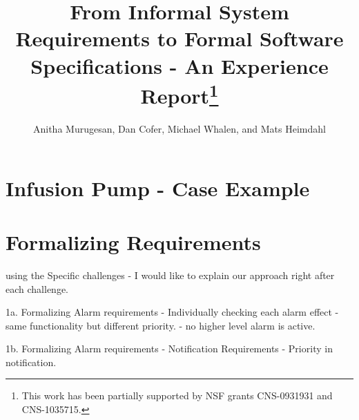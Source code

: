 \documentclass{llncs}
\begin{document}
\newcommand{\mcdc}{}%
\newcommand{\mike}[1]{\textcolor{red}{Mike: #1}}
\newcommand{\anitha}[1]{\textcolor{red}{#1}}
\newcommand{\oksana}[1]{\textcolor{magenta}{Oksana: #1}}
\newcommand{\sjp}[1]{\textcolor{blue}{#1}}
\newcommand{\nsr}[1]{\textcolor{blue}{#1}}
\sloppypar


\title{From Informal System Requirements to Formal Software Specifications  - An Experience Report\thanks{This work has been partially supported by NSF grants CNS-0931931 and CNS-1035715.}}

\author{Anitha Murugesan, Dan Cofer, Michael Whalen, and Mats Heimdahl}

\maketitle

\begin{abstract}

\end{abstract}








%


\iffalse
\section{Infusion Pump - Case Example}
\section{Formalizing Requirements}

using the Specific challenges - I would like to explain our approach right after each challenge.

1a. Formalizing Alarm requirements - Individually checking each alarm effect - same functionality but different priority. - no higher level alarm is active.

\vspace{2mm}

1b. Formalizing Alarm requirements - Notification Requirements - Priority in notification.

\vspace{2mm}
\end{document}

